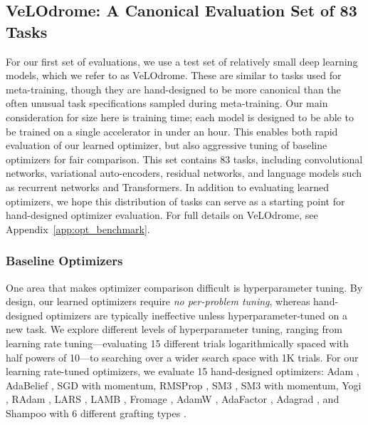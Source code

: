 \documentclass[11pt]{article}
\begin{document}
\subsection{VeLOdrome: A Canonical Evaluation Set of 83 Tasks}
\label{sec:83}
For our first set of evaluations, we use a test set of relatively small deep learning models, which we refer to as VeLOdrome. 
These are similar to tasks used for meta-training, though they are hand-designed to be more canonical than the often unusual task specifications sampled during meta-training.
Our main consideration for size here is training time; each model is designed to be able to be trained on a single accelerator in under an hour. This enables both rapid evaluation of our learned optimizer, but also aggressive tuning of baseline optimizers for fair comparison. 
This set contains 83 tasks, including convolutional networks, variational auto-encoders, residual networks, and language models such as recurrent networks and Transformers.
In addition to evaluating learned optimizers, we hope this distribution of tasks can serve as a starting point for hand-designed optimizer evaluation.
For full details on VeLOdrome, see Appendix~\ref{app:opt_benchmark}. 


\subsubsection{Baseline Optimizers}
One area that makes optimizer comparison difficult is hyperparameter tuning.
By design, our learned optimizers require \emph{no per-problem tuning}, whereas hand-designed optimizers are typically ineffective unless hyperparameter-tuned on a new task.
We explore different levels of hyperparameter tuning, ranging from learning rate tuning---evaluating 15 different trials logarithmically spaced with half powers of 10---to searching over a wider search space with 1K trials.
For our learning rate-tuned optimizers, we evaluate 15 hand-designed optimizers: Adam \citep{kingma2014adam}, AdaBelief \citep{zhuang2020adabelief}, SGD with momentum, RMSProp \citep{Tieleman2012}, SM3 \citep{anil2019memory}, SM3 with momentum, Yogi \citep{zaheer2018adaptive}, RAdam \citep{liu2019variance},  LARS \citep{you2017large},  LAMB \citep{you2019large}, Fromage \citep{bernstein2020distance}, AdamW \citep{loshchilov2017decoupled}, AdaFactor \citep{shazeer2018adafactor}, Adagrad \citep{duchi2011adaptive}, and Shampoo \citep{gupta2018shampoo, anil2020second} with 6 different grafting types \citep{agarwal2020disentangling}.
\end{document}
